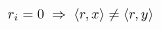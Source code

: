 \documentclass[preview]{standalone}
\begin{document}
\begin{center}
$r_i=0 \hspace{0.1cm}\Rightarrow\hspace{0.1cm} \langle r, x\rangle \neq \langle r,y \rangle $
\end{center}
\end{document}
